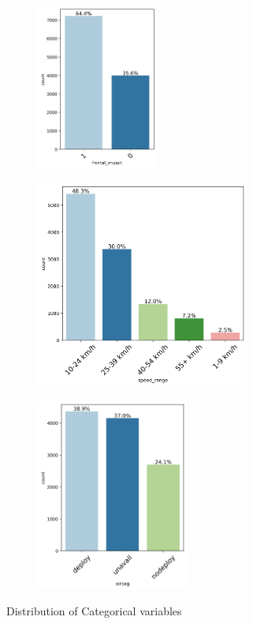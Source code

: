 \documentclass[12pt,a4paper]{article}
\begin{document}
\begin{figure}[h]
\begin{subfigure}[t]{0.24\textwidth}
			\caption{}
			\label{fig:occ_role_dist}
		\end{subfigure}
		\hfill
		\begin{subfigure}[t]{0.24\textwidth}
			\centering
			\includegraphics[width=4cm]{frontal_impact_dist.png}
			\caption{}
			\label{fig:frontal_impact_dist}
		\end{subfigure}
		\hfill
		\begin{subfigure}[t]{0.35\textwidth}
			\centering
			\includegraphics[width=7cm]{speed_dist.png}
			\caption{}
			\label{fig:speed_dist}
		\end{subfigure}
		\hfill
		\begin{subfigure}[t]{0.35\textwidth}
			\centering
			\includegraphics[width=5cm]{airbag_dist.png}
			\caption{}
			\label{fig:airbag_dist}
		\end{subfigure}
		\caption{Distribution of Categorical variables}
		\label{fig: Distribution of Categorcal variables }
	\end{figure}	
\end{document}
